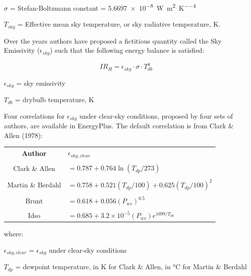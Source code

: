 $\sigma$ = Stefan-Boltzmann constant = \SI{5.6697e-8}{\watt\per\meter\squared\per\kelvin\tothe{4}}

$T_{sky}$ = Effective mean sky temperature, or sky radiative temperature, \si{\kelvin}.
\newline

Over the years authors have proposed a fictitious quantity called the Sky Emissivity ($\epsilon_{sky}$) such that the following energy balance is satisfied:

\begin{equation}
IR_H = \epsilon_{sky} \cdot \sigma \cdot T_{db}^4
\end{equation}

$\epsilon_{sky}$ = sky emissivity

$T_{db}$ = drybulb temperature, \si{\kelvin}
\newline

Four correlations for $\epsilon_{sky}$ under clear-sky conditions, proposed by four sets of authors, are available in EnergyPlus. The default correlation is from Clark \& Allen (1978):

\begin{table}[hbtp]
\centering
\begin{tabular}{cl}
\textbf{Author}   & $\epsilon_{sky, clear}$ \\ \\
Clark \& Allen    & $= 0.787 + 0.764 \ln\left(T_{dp}/273\right)$ \\ \\
Martin \& Berdahl & $= 0.758 + 0.521 \left(T_{dp}/100\right) + 0.625  \left(T_{dp} / 100\right)^2$ \\ \\
Brunt             & $= 0.618 + 0.056 \left(P_{wv}\right)^{0.5}$ \\ \\
Idso              & $= 0.685 + 3.2\times10^{-5} \left(P_{wv}\right) e^{1699/T_{db}} $
\end{tabular}
\end{table}

\noindent where:
\newline

$\epsilon_{sky, clear}$ = $\epsilon_{sky}$ under clear-sky conditions
\newline

$T_{dp}$ = dewpoint temperature, in \si{\kelvin} for Clark \& Allen, in \si{\celsius} for Martin \& Berdahl
\newline


